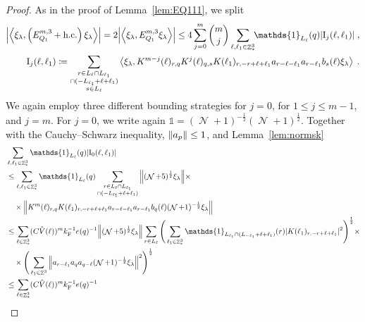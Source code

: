 \documentclass[12pt,a4paper]{article}
\numberwithin{equation}{section}
\newcommand{\1}{\mathbb{I}}
\newcommand{\F}{\mathrm{F}}
\newcommand{\I}{\mathrm{I}}
\DeclareMathOperator{\Z}{\mathbb{Z}}
\DeclareMathOperator{\NN}{\mathcal{N}}
\newcommand{\half}{\frac{1}{2}}
\newcommand{\eva}[1]{\left\langle #1 \right\rangle}
\theoremstyle{plain}
\theoremstyle{definition}
\theoremstyle{remark}
\theoremstyle{plain}
\theoremstyle{definition}
\theoremstyle{remark}
\begin{document}
\begin{proof}
As in the proof of Lemma~\ref{lem:EQ111}, we split
\begin{equation} \label{eq:EQ1121}
\begin{aligned}
	\abs{\eva{\xi_\lambda,\left(E^{m,3}_{Q_1}+\mathrm{h.c.}\right) \xi_\lambda }} 
	= 2\abs{\eva{\xi_\lambda, E^{m,3}_{Q_1} \xi_\lambda }}
	\le 4 \sum_{j=0}^m {{m}\choose j} \sum\limits_{\ell,\ell_1 \in \Z^3_*}\!\! \mathds{1}_{L_\ell}(q) |\I_j(\ell, \ell_1)| \;,\\
	\I_j(\ell, \ell_1)
	\coloneq \sum\limits_{\substack{r\in L_{\ell} \cap L_{\ell_1}\\ \cap (-L_{\ell_1}+\ell+\ell_1)\\ s \in L_{\ell}}} 
		\eva{\xi_\lambda, K^{m-j}(\ell)_{r,q} K^{j}(\ell)_{q,s}K(\ell_1)_{r,-r+\ell+\ell_1} a_{r-\ell-\ell_1} a_{r-\ell_1} b_{s}(\ell) \xi_\lambda} \;. \\
\end{aligned}
\end{equation}
We again employ three different bounding strategies for $ j = 0 $, for $ 1 \le j \le m-1 $, and $ j = m $. For $ j = 0 $, we write again $\mathds{1} = (\NN+1)^{-\half}(\NN+1)^{\half}$. Together with the Cauchy--Schwarz inequality, $ \norm{a_p} \le 1 $, and Lemma~\ref{lem:normsk}
\textcolor{green!30!black}{
\begin{align}
	&\sum_{\ell,\ell_1 \in \Z^3_*} \mathds{1}_{L_\ell}(q) |\I_0(\ell, \ell_1)| \nonumber\\
	&\leq \sum_{\ell,\ell_1 \in \Z^3_*} \mathds{1}_{L_\ell}(q) \sum\limits_{\substack{r\in L_{\ell} \cap L_{\ell_1}\\ \cap (-L_{\ell_1}+\ell+\ell_1)}}
		\norm{ (\NN+5)^{\half} \xi_\lambda} \times \nonumber\\
	&\quad \times \norm{ K^m(\ell )_{r,q} K(\ell_1)_{r,-r+\ell+\ell_1} a_{r-\ell-\ell_1} a_{r-\ell_1} b_{q}(\ell) (\NN+1)^{-\half} \xi_\lambda }\nonumber\\
	 &\leq \sum_{\ell \in \Z^3_*} (C \hat{V}(\ell))^m k_{\F}^{-1} e(q)^{-1}
	 	\norm{ (\NN+5)^{\half} \xi_\lambda}
	 	\sum_{r \in L_\ell} \Bigg( \sum_{\ell_1 \in \Z^3_*} \mathds{1}_{L_{\ell_1} \cap (L_{-\ell_1}+\ell+\ell_1)}(r) |K(\ell_1)_{r,-r+\ell+\ell_1}|^2 \Bigg)^{\half} \times \nonumber\\
	 &\quad \times \Bigg( \sum\limits_{\ell_1 \in \Z^3} \norm{ a_{r-\ell_1} a_q a_{q-\ell} (\NN+1)^{-\half} \xi_\lambda }^2 \Bigg)^\half \nonumber\\
	 &\leq \sum_{\ell \in \Z^3_*} (C \hat{V}(\ell))^m k_{\F}^{-1} e(q)^{-1}

\end{align}}
\end{proof}
\end{document}
